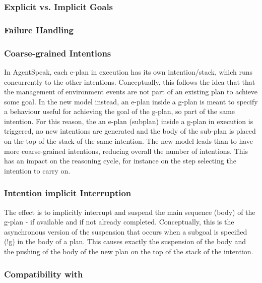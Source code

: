 \subsubsection{Explicit vs. Implicit Goals}

\subsubsection{Failure Handling}

\subsubsection{Coarse-grained Intentions}

In AgentSpeak, each e-plan in execution has its own intention/stack, which runs concurrently to the other intentions. Conceptually, this follows the idea that that the management of environment events are not part of an existing plan to achieve some goal.
%
In the new model instead, an e-plan inside a g-plan is meant to specify a behaviour useful for achieving the goal of the g-plan, so part of the same intention.
%
For this reason, the an e-plan (subplan) inside a g-plan in execution is triggered, no new intentions are generated and the body of the sub-plan is placed on the top of the stack of the same intention. 
%
The new model leads than to have more coarse-grained intentions, reducing overall the number of intentions. This has an impact on the reasoning cycle, for instance on the step selecting the intention to carry on.

\subsubsection{Intention implicit Interruption}

The effect is to implicitly interrupt and suspend the main sequence (body) of the g-plan - if available and if not already completed.
%
Conceptually, this is the asynchronous version of the suspension that occurs when a subgoal is specified (!g) in the body of a plan. This causes exactly the suspension of the body and the pushing of the body of the new plan on the top of the stack of the intention.

\subsubsection{Compatibility with {\asl}}

